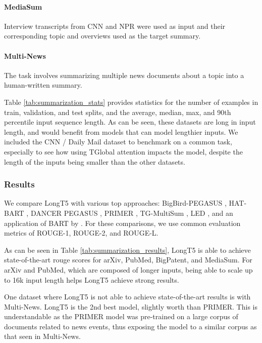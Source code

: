 \paragraph{MediaSum} \cite{zhu-etal-2021-mediasum} Interview transcripts from CNN and NPR were used as input and their corresponding topic and overviews used as the target summary.

\paragraph{Multi-News} \cite{fabbri-etal-2019-multi} The task involves summarizing multiple news documents about a topic into a human-written summary.

Table \ref{tab:summarization_stats} provides statistics for the number of examples in train, validation, and test splits, and the average, median, max, and 90th percentile input sequence length. As can be seen, these datasets are long in input length, and would benefit from models that can model lengthier inputs. We included the CNN / Daily Mail dataset to benchmark on a common task, especially to see how using TGlobal attention impacts the model, despite the length of the inputs being smaller than the other datasets.

\subsubsection{Results}

We compare LongT5 with various top approaches: BigBird-PEGASUS \cite{zaheer2020}, HAT-BART \cite{rohde2021hierarchical}, DANCER PEGASUS \cite{gidiotis2020}, PRIMER \cite{xiao2021primer}, TG-MultiSum \cite{cui2021topicguided}, LED \cite{Beltagy2020Longformer}, and an application of BART by . For these comparisons, we use common evaluation metrics of ROUGE-1, ROUGE-2, and ROUGE-L.

As can be seen in Table \ref{tab:summarization_results}, LongT5 is able to achieve state-of-the-art rouge scores for arXiv, PubMed, BigPatent, and MediaSum. For arXiv and PubMed, which are composed of longer inputs, being able to scale up to 16k input length helps LongT5 achieve strong results.

One dataset where LongT5 is not able to achieve state-of-the-art results is with Multi-News. LongT5 is the 2nd best model, slightly worth than PRIMER. This is understandable as the PRIMER model was pre-trained on a large corpus of documents related to news events, thus exposing the model to a similar corpus as that seen in Multi-News.

